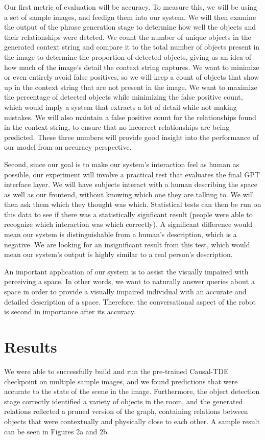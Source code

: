 \documentclass[letterpaper, 10 pt, conference]{ieeeconf}  %
\begin{document}
    Our first metric of evaluation will be accuracy. To measure this, we will be using a set of sample images, and feedign them into our system. We will then examine the output of the phrase generation stage to determine how well the objects and their relationships were detcted. We count the number of unique objects in the generated context string and compare it to the total number of objects present in the image to determine the proportion of detected objects, giving us an idea of how much of the image's detail the context string captures. We want to minimize or even entirely avoid false positives, so we will keep a count of objects that show up in the context string that are not present in the image. We want to maximize the percentage of detected objects while minimizing the false positive count, which would imply a system that extracts a lot of detail while not making mistakes. We will also maintain a false positive count for the relationships found in the context string, to ensure that no incorrect relationships are being predicted. These three numbers will provide good insight into the performance of our model from an accuracy perspective.

    Second, since our goal is to make our system's interaction feel as human as possible, our experiment will involve a practical test that evaluates the final GPT interface layer. We will have subjects interact with a human describing the space as well as our frontend, without knowing which one they are talking to. We will then ask them which they thought was which. Statistical tests can then be run on this data to see if there was a statistically signficant result (people were able to recognize which interaction was which correctly). A significant difference would mean our system is distinguishable from a human's description, which is a negative. We are looking for an insignificant result from this test, which would mean our system's output is highly similar to a real person's description.

    An important application of our system is to assist the visually impaired with perceiving a space. In other words, we want to naturally answer queries about a space in order to provide a visually impaired individual with an accurate and detailed description of a space. Therefore, the conversational aspect of the robot is second in importance after its accuracy.


\section{Results}
    We were able to successfully build and run the pre-trained Causal-TDE checkpoint on multiple sample images, and we found predictions that were accurate to the state of the scene in the image. Furthermore, the object detection stage correctly identified a variety of objects in the room, and the generated relations reflected a pruned version of the graph, containing relations between objects that were contextually and physically close to each other. A sample result can be seen in Figures 2a and 2b.
\end{document}
